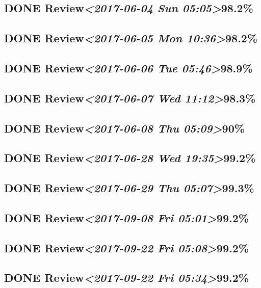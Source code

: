 \documentclass[11pt]{ctexart}
\begin{document}
\subsection{{\bfseries\sffamily DONE} Review\textit{<2017-06-04 Sun 05:05>}98.2\%}
\label{sec:org995256e}
\subsection{{\bfseries\sffamily DONE} Review\textit{<2017-06-05 Mon 10:36>}98.2\%}
\label{sec:org119dfec}
\subsection{{\bfseries\sffamily DONE} Review\textit{<2017-06-06 Tue 05:46>}98.9\%}
\label{sec:org3a0110f}
\subsection{{\bfseries\sffamily DONE} Review\textit{<2017-06-07 Wed 11:12>}98.3\%}
\label{sec:org4cade03}
\subsection{{\bfseries\sffamily DONE} Review\textit{<2017-06-08 Thu 05:09>}90\%}
\label{sec:org5739b3b}
\subsection{{\bfseries\sffamily DONE} Review\textit{<2017-06-28 Wed 19:35>}99.2\%}
\label{sec:orgffc09c0}
\subsection{{\bfseries\sffamily DONE} Review\textit{<2017-06-29 Thu 05:07>}99.3\%}
\label{sec:org3d282b4}

\subsection{{\bfseries\sffamily DONE} Review\textit{<2017-09-08 Fri 05:01>}99.2\%}
\label{sec:org06157e1}
\subsection{{\bfseries\sffamily DONE} Review\textit{<2017-09-22 Fri 05:08>}99.2\%}
\label{sec:orgd2250ef}
\subsection{{\bfseries\sffamily DONE} Review\textit{<2017-09-22 Fri 05:34>}99.2\%}
\label{sec:org96118d1}
\end{document}
